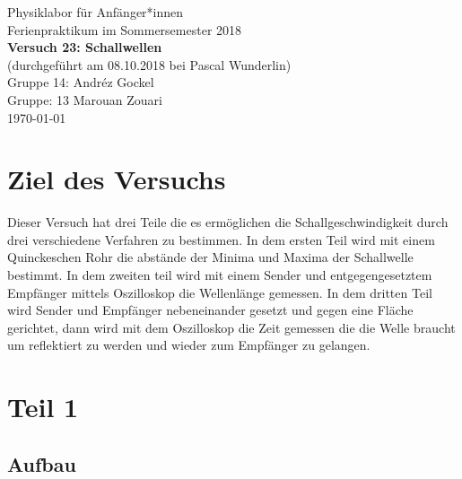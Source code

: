 \documentclass[11pt,a4paper]{article}
\begin{document}
{
\centering 
\large 
Physiklabor für Anf\"anger*innen \\
Ferienpraktikum im Sommersemester 2018 \\[4mm]
\textbf{\LARGE 
Versuch 23: Schallwellen
} \\[3mm]
(durchgef\"uhrt am 08.10.2018 bei Pascal Wunderlin) \\
Gruppe 14: Andréz Gockel\\ Gruppe: 13  Marouan Zouari\\
\today \\[10mm]
}

\vfill
\tableofcontents
\vfill
\pagebreak

\section{Ziel des Versuchs}
Dieser Versuch hat drei Teile die es ermöglichen die Schallgeschwindigkeit durch drei verschiedene Verfahren zu bestimmen. In dem ersten Teil wird mit einem Quinckeschen Rohr die abstände der Minima und Maxima der Schallwelle bestimmt. In dem zweiten teil wird mit einem Sender und entgegengesetztem Empfänger mittels Oszilloskop die Wellenlänge gemessen. In dem dritten Teil wird Sender und Empfänger nebeneinander gesetzt und gegen eine Fläche gerichtet, dann wird mit dem Oszilloskop die Zeit gemessen die die Welle braucht um reflektiert zu werden und wieder zum Empfänger zu gelangen.

\section{Teil 1}

\subsection{Aufbau}
\end{document}
